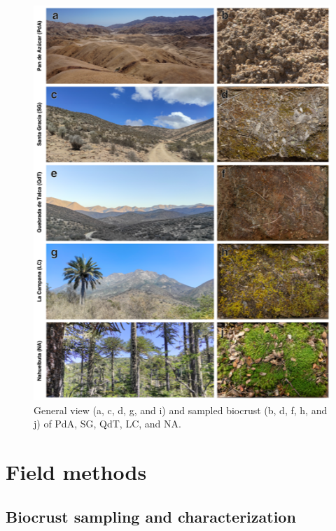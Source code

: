 \begin{figure}[h!]
	\centering
	\includegraphics[width=1\textwidth]{img/location-panel.png}
	\caption[General view and biocrust sampled for the study sites]{General view (a, c, d, g, and i) and sampled biocrust (b, d, f, h, and j) of PdA, SG, QdT, LC, and NA.}
	\label{fig:location-panel}
\end{figure}

\FloatBarrier

\section{Field methods}
\label{sec:FieldMethods}
\subsection{Biocrust sampling and characterization}

